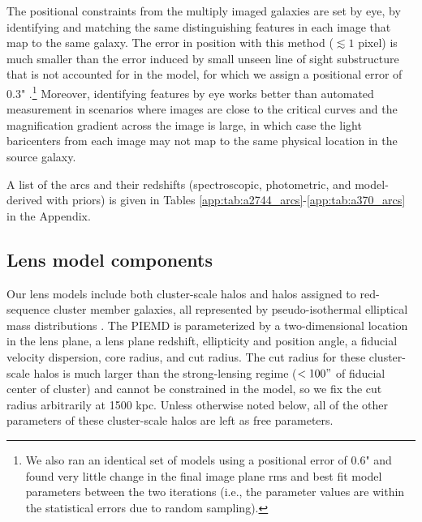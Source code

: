 The positional constraints from the multiply imaged galaxies are set by eye, by identifying and matching the same distinguishing features in each image that map to the same galaxy. The error in position with this method ($\lesssim1$ pixel) is much smaller than the error induced by small unseen line of sight substructure that is not accounted for in the model, for which we assign a positional error of 0.3" \citep[following][]{Jullo:2007lr,Limousin:2007fk}.\footnote{We also ran an identical set of models using a positional error of 0.6" and found very little change in the final image plane rms and best fit model parameters between the two iterations (i.e., the parameter values are within the statistical errors due to random sampling).} Moreover, identifying features by eye works better than automated measurement in scenarios where images are close to the critical curves and the magnification gradient across the image is large, in which case the light baricenters from each image may not map to the same physical location in the source galaxy.

A list of the arcs and their redshifts (spectroscopic, photometric, and model-derived with priors) is given in Tables \ref{app:tab:a2744_arcs}-\ref{app:tab:a370_arcs} in the Appendix.

\subsection{Lens model components}

Our lens models include both cluster-scale halos and halos assigned to red-sequence cluster member galaxies, all represented by pseudo-isothermal elliptical mass distributions \citep[PIEMD;][]{Jullo:2007lr,Limousin:2005cr}. The PIEMD is parameterized by a two-dimensional location in the lens plane, a lens plane redshift, ellipticity and position angle, a fiducial velocity dispersion, core radius, and cut radius. The cut radius for these cluster-scale halos is much larger than the strong-lensing regime ($<100"$ of fiducial center of cluster) and cannot be constrained in the model, so we fix the cut radius arbitrarily at 1500 kpc. Unless otherwise noted below, all of the other parameters of these cluster-scale halos are left as free parameters.

